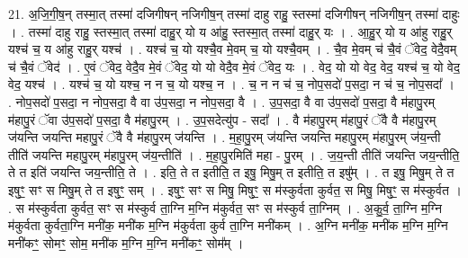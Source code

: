\documentclass[17pt]{extarticle}
\begin{document}
21. अ॒जि॒गी॒ष॒न् तस्मा॒त् तस्मा॑ दजिगीषन् नजिगीष॒न् तस्मा॑ दाहु राहु॒ स्तस्मा॑ दजिगीषन् नजिगीष॒न् तस्मा॑ दाहुः । . तस्मा॑ दाहु राहु॒ स्तस्मा॒त् तस्मा॑ दाहु॒र् यो य आ॑हु॒ स्तस्मा॒त् तस्मा॑ दाहु॒र् यः । . आ॒हु॒र् यो य आ॑हु राहु॒र् यश्च॑ च॒ य आ॑हु राहु॒र् यश्च॑ । . यश्च॑ च॒ यो यश्चै॒व मे॒वम् च॒ यो यश्चै॒वम् । . चै॒व मे॒वम् च॑ चै॒वं ॅवेद॒ वेदै॒वम् च॑ चै॒वं ॅवेद॑ । . ए॒वं ॅवेद॒ वेदै॒व मे॒वं ॅवेद॒ यो यो वेदै॒व मे॒वं ॅवेद॒ यः । . वेद॒ यो यो वेद॒ वेद॒ यश्च॑ च॒ यो वेद॒ वेद॒ यश्च॑ । . यश्च॑ च॒ यो यश्च॒ न न च॒ यो यश्च॒ न । . च॒ न न च॑ च॒ नोप॒सदो॑ प॒सदा॒ न च॑ च॒ नोप॒सदा᳚ । . नोप॒सदो॑ प॒सदा॒ न नोप॒सदा॒ वै वा उ॑प॒सदा॒ न नोप॒सदा॒ वै । . उ॒प॒सदा॒ वै वा उ॑प॒सदो॑ प॒सदा॒ वै म॑हापु॒रम् म॑हापु॒रं ॅवा उ॑प॒सदो॑ प॒सदा॒ वै म॑हापु॒रम् । . उ॒प॒सदेत्यु॑प - सदा᳚ । . वै म॑हापु॒रम् म॑हापु॒रं ॅवै वै म॑हापु॒रम् ज॑यन्ति जयन्ति महापु॒रं ॅवै वै म॑हापु॒रम् ज॑यन्ति । . म॒हा॒पु॒रम् ज॑यन्ति जयन्ति महापु॒रम् म॑हापु॒रम् ज॑य॒न्ती तीति॑ जयन्ति महापु॒रम् म॑हापु॒रम् ज॑य॒न्तीति॑ । . म॒हा॒पु॒रमिति॑ महा - पु॒रम् । . ज॒य॒न्ती तीति॑ जयन्ति जय॒न्तीति॒ ते त इति॑ जयन्ति जय॒न्तीति॒ ते । . इति॒ ते त इतीति॒ त इषु॒ मिषु॒म् त इतीति॒ त इषु᳚म् । . त इषु॒ मिषु॒म् ते त इषुꣳ॒॒ सꣳ स मिषु॒म् ते त इषुꣳ॒॒ सम् । . इषुꣳ॒॒ सꣳ स मिषु॒ मिषुꣳ॒॒ स म॑स्कुर्वता कुर्वत॒ स मिषु॒ मिषुꣳ॒॒ स म॑स्कुर्वत । . स म॑स्कुर्वता कुर्वत॒ सꣳ स म॑स्कुर्व ता॒ग्नि म॒ग्नि म॑कुर्वत॒ सꣳ स म॑स्कुर्व ता॒ग्निम् । . अ॒कु॒र्व॒ ता॒ग्नि म॒ग्नि म॑कुर्वता कुर्वता॒ग्नि मनी॑क॒ मनी॑क म॒ग्नि म॑कुर्वता कुर्व ता॒ग्नि मनी॑कम् । . अ॒ग्नि मनी॑क॒ मनी॑क म॒ग्नि म॒ग्नि मनी॑कꣳ॒॒ सोमꣳ॒॒ सोम॒ मनी॑क म॒ग्नि म॒ग्नि मनी॑कꣳ॒॒ सोम᳚म् । \newline
\end{document}
